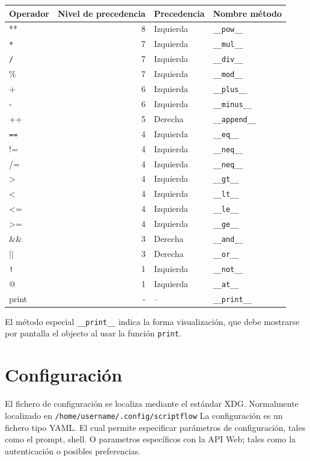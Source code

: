 \documentclass[11pt]{article}
\begin{document}
\begin{center}
\begin{tabular}{lrll}
Operador & Nivel de precedencia & Precedencia & Nombre método\\
\hline
** & 8 & Izquierda & \texttt{\_\_pow\_\_}\\
\texttt{*} & 7 & Izquierda & \texttt{\_\_mul\_\_}\\
\texttt{/} & 7 & Izquierda & \texttt{\_\_div\_\_}\\
\% & 7 & Izquierda & \texttt{\_\_mod\_\_}\\
+ & 6 & Izquierda & \texttt{\_\_plus\_\_}\\
- & 6 & Izquierda & \texttt{\_\_minus\_\_}\\
++ & 5 & Derecha & \texttt{\_\_append\_\_}\\
\texttt{==} & 4 & Izquierda & \texttt{\_\_eq\_\_}\\
!= & 4 & Izquierda & \texttt{\_\_neq\_\_}\\
/= & 4 & Izquierda & \texttt{\_\_neq\_\_}\\
> & 4 & Izquierda & \texttt{\_\_gt\_\_}\\
< & 4 & Izquierda & \texttt{\_\_lt\_\_}\\
<= & 4 & Izquierda & \texttt{\_\_le\_\_}\\
>= & 4 & Izquierda & \texttt{\_\_ge\_\_}\\
\&\& & 3 & Derecha & \texttt{\_\_and\_\_}\\
\(\vert{} \vert{}\) & 3 & Derecha & \texttt{\_\_or\_\_}\\
\texttt{!} & 1 & Izquierda & \texttt{\_\_not\_\_}\\
@ & 1 & Izquierda & \texttt{\_\_at\_\_}\\
print & - & -- & \texttt{\_\_print\_\_}\\
\end{tabular}
\end{center}


El método especial \texttt{\_\_print\_\_} indica la forma visualización, que debe mostrarse por pantalla el objecto al usar la función \texttt{print}.


\section{Configuración}
\label{sec:org74a040c}

\label{org7b9a2e7}
El fichero de configuración se localiza mediante el
estándar XDG. Normalmente localizado en \texttt{/home/username/.config/scriptflow}
La configuración es un fichero tipo YAML. El cual permite especificar
parámetros de configuración, tales como el prompt, shell. O parametros
específicos con la API Web; tales como la autenticación o posibles
preferencias.
\end{document}
